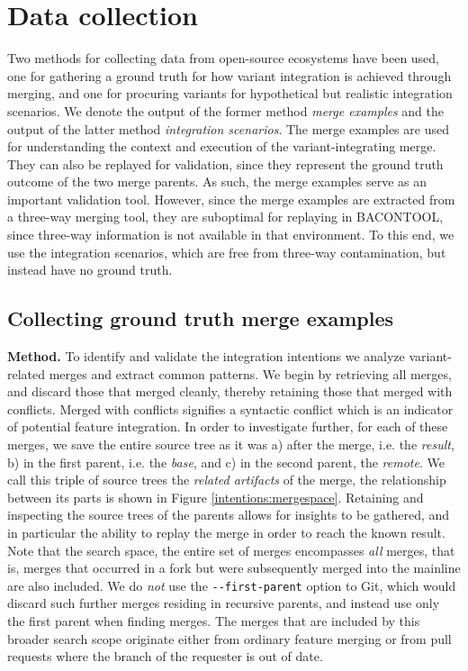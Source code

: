 \section{Data collection}
Two methods for collecting data from open-source ecosystems have been used, one for gathering a ground truth for how variant integration is achieved through merging, and one for procuring variants for hypothetical but realistic  integration scenarios. We denote the output of the former method \textit{merge examples} and the output of the latter method \textit{integration scenarios}. The merge examples are used for understanding the context and execution of the variant-integrating merge. They can also be replayed for validation, since they represent the ground truth outcome of the two merge parents. As such, the merge examples serve as an important validation tool. However, since the merge examples are extracted from a three-way merging tool, they are suboptimal for replaying in BACONTOOL, since three-way information is  not available in that environment. To this end, we use the integration scenarios, which are free from three-way contamination, but instead have no ground truth.

\subsection{Collecting ground truth merge examples}
\textbf{Method.} To identify and validate the integration intentions we analyze variant-related merges and extract common patterns. We begin by retrieving all merges, and discard those that merged cleanly, thereby retaining those that merged with conflicts. Merged with conflicts signifies a syntactic conflict which is an indicator of potential feature integration. In order to investigate further, for each of these merges, we save the entire source tree as it was a) after the merge, i.e. the \textit{result}, b) in the first parent, i.e. the \textit{base}, and c) in the second parent, the \textit{remote}. We call this triple of source trees the \textit{related artifacts} of the merge, the relationship between its parts is shown in Figure \ref{intentions:mergespace}. Retaining and inspecting the source trees of the parents allows for insights to be gathered, and in particular the ability to replay the merge in order to reach the known result. Note that the search space, the entire set of merges encompasses \textit{all} merges, that is, merges that occurred in a fork but were subsequently merged into the mainline are also included. We do \textit{not} use the \texttt{-{}-first-parent} option to Git, which would discard such further merges residing in recursive parents, and instead use only the first parent when finding merges. The merges that are included by this broader search scope originate either from ordinary feature merging or from pull requests where the branch of the requester is out of date. 

